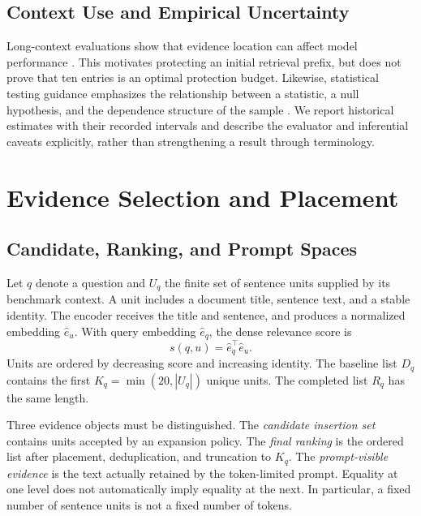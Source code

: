 \documentclass[11pt,a4paper]{article}
\begin{document}
\subsection{Context Use and Empirical Uncertainty}
Long-context evaluations show that evidence location can affect model
performance \citep{liu2024lostmiddle}. This motivates protecting an initial
retrieval prefix, but does not prove that ten entries is an optimal protection
budget. Likewise, statistical testing guidance emphasizes the relationship
between a statistic, a null hypothesis, and the dependence structure of the
sample \citep{dror2018hitchhiker}. We report historical estimates with their
recorded intervals and describe the evaluator and inferential caveats
explicitly, rather than strengthening a result through terminology.

\section{Evidence Selection and Placement}
\subsection{Candidate, Ranking, and Prompt Spaces}
Let $q$ denote a question and $U_q$ the finite set of sentence units supplied
by its benchmark context. A unit includes a document title, sentence text,
and a stable identity. The encoder receives the title and sentence, and
produces a normalized embedding $\hat e_u$. With query embedding $\hat e_q$,
the dense relevance score is
\begin{equation}
s(q,u)=\hat e_q^\top\hat e_u.
\end{equation}
Units are ordered by decreasing score and increasing identity. The baseline
list $D_q$ contains the first $K_q=\min(20,|U_q|)$ unique units.
The completed list $R_q$ has the same length.

Three evidence objects must be distinguished. The \emph{candidate insertion
set} contains units accepted by an expansion policy. The \emph{final ranking}
is the ordered list after placement, deduplication, and truncation to $K_q$.
The \emph{prompt-visible evidence} is the text actually retained by the
token-limited prompt. Equality at one level does not automatically imply
equality at the next. In particular, a fixed number of sentence units is not
a fixed number of tokens.
\end{document}
